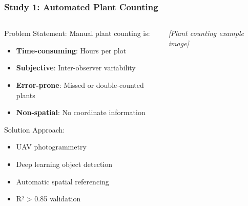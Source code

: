 \documentclass[aspectratio=43]{beamer}
\begin{document}
\begin{frame}
    \frametitle{Study 1: Automated Plant Counting}
    
    \begin{columns}
        \begin{column}{0.6\textwidth}
            \begin{block}{Problem Statement:}
                Manual plant counting is:
                \begin{itemize}
                    \item \textbf{Time-consuming}: Hours per plot
                    \item \textbf{Subjective}: Inter-observer variability
                    \item \textbf{Error-prone}: Missed or double-counted plants
                    \item \textbf{Non-spatial}: No coordinate information
                \end{itemize}
            \end{block}
            
            \begin{exampleblock}{Solution Approach:}
                \begin{itemize}
                    \item UAV photogrammetry
                    \item Deep learning object detection
                    \item Automatic spatial referencing
                    \item R² > 0.85 validation
                \end{itemize}
            \end{exampleblock}
        \end{column}
        
        \begin{column}{0.4\textwidth}
            \begin{center}
                \textit{[Plant counting example image]}
            \end{center}
        \end{column}
    \end{columns}
\end{frame}
\end{document}
